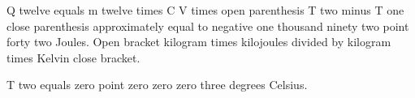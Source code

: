 Q twelve equals m twelve times C V times open parenthesis T two minus T one close parenthesis approximately equal to negative one thousand ninety two point forty two Joules. Open bracket kilogram times kilojoules divided by kilogram times Kelvin close bracket.

T two equals zero point zero zero zero three degrees Celsius.